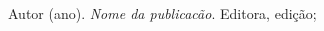 \begin{thebibliography}{30} 

	 Autor (ano). \textit{Nome da publicacão}. Editora, edição;

\end{thebibliography}
